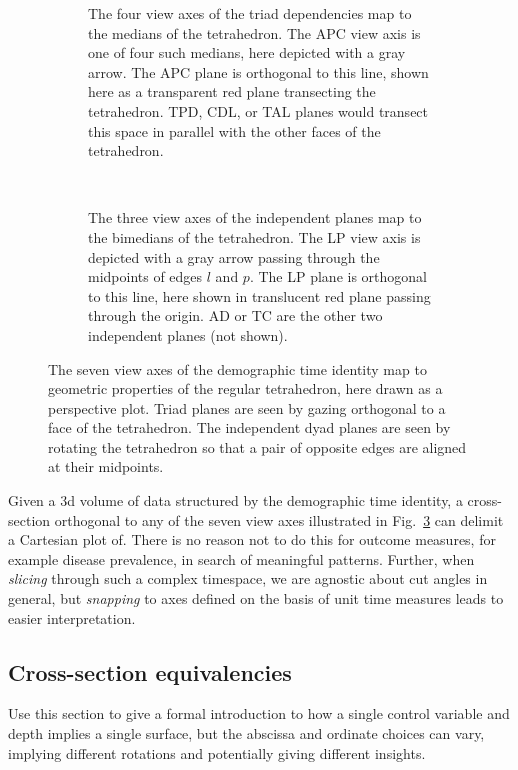 \documentclass{bmcart}
\begin{document}
\begin{figure}
\begin{subfigure}[t]{0.45\linewidth}
    \centering
    \resizebox{\linewidth}{\linewidth}{
    
    }
    \caption{The four view axes of the triad dependencies map to the medians of the tetrahedron. The APC view axis is one of four such medians, here depicted with a gray arrow. The APC plane is orthogonal to this line, shown here as a transparent red plane transecting the tetrahedron. TPD, CDL, or TAL planes would transect this space in parallel with the other faces of the tetrahedron.}
    \label{fig:depviewaxes}
\end{subfigure}
~~
\begin{subfigure}[t]{0.45\linewidth}
    \resizebox{\linewidth}{\linewidth}{
     
     }
    \caption{The three view axes of the independent planes map to the bimedians of the tetrahedron. The LP view axis is depicted with a gray arrow passing through the midpoints of edges $l$ and $p$. The LP plane is orthogonal to this line, here shown in translucent red plane passing through the origin. AD or TC are the other two independent planes (not shown).}
    \label{fig:indepviewaxes}       
\end{subfigure}
\caption{The seven view axes of the demographic time identity map to geometric properties of the regular tetrahedron, here drawn as a perspective plot. Triad planes are seen by gazing orthogonal to a face of the tetrahedron. The independent dyad planes are seen by rotating the tetrahedron so that a pair of opposite edges are aligned at their midpoints. }
\label{fig:viewaxes}
\end{figure}

Given a 3d volume of data structured by the demographic time identity, a cross-section orthogonal to any of the seven view axes illustrated in Fig.~\ref{fig:viewaxes} can delimit a Cartesian plot of. There is no reason not to do this for outcome measures, for example disease prevalence, in search of meaningful patterns. Further, when \emph{slicing} through such a complex timespace, we are agnostic about cut angles in general, but \emph{snapping} to axes defined on the basis of unit time measures leads to easier interpretation.

\subsection*{Cross-section equivalencies}
Use this section to give a formal introduction to how a single control variable and depth implies a single surface, but the abscissa and ordinate choices can vary, implying different rotations and potentially giving different insights.
\end{document}
